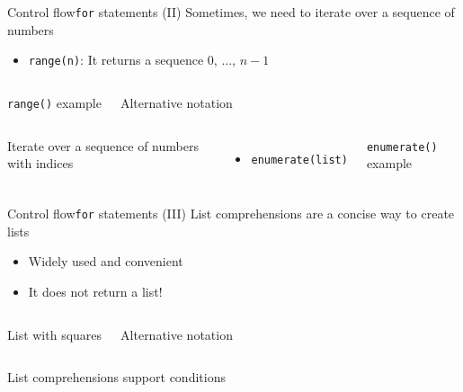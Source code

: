 \documentclass[10pt,compress]{beamer} %
\begin{document}
\begin{frame}{Control flow}{\texttt{for} statements (II)}
	Sometimes, we need to iterate over a sequence of numbers
	\begin{itemize}
		\item \texttt{range(n)}: It returns a sequence $0$, ..., $n-1$
	\end{itemize}

    \begin{columns}
		\begin{exampleblock}{\texttt{range()} example}
		
		\end{exampleblock}
		
		\begin{exampleblock}{Alternative notation}
		
		\end{exampleblock}
	\end{columns}

    \begin{columns}
	    Iterate over a sequence of numbers with indices
	    \begin{itemize}
		    \item \texttt{enumerate(list)}
	    \end{itemize}
		\begin{exampleblock}{\texttt{enumerate()} example}
		
		\end{exampleblock}
	\end{columns}
\end{frame}

\begin{frame}{Control flow}{\texttt{for} statements (III)}
	List comprehensions are a concise way to create lists
	\begin{itemize}
		\item Widely used and convenient
        \item It does not return a list!
	\end{itemize}

    \begin{columns}
		\begin{exampleblock}{List with squares}
		
		\end{exampleblock}
		
		\begin{exampleblock}{Alternative notation}
		
		\end{exampleblock}
	\end{columns}

    \bigskip

    List comprehensions support conditions

    \begin{columns}
		\begin{exampleblock}{}
		
		\end{exampleblock}
    \end{columns}
\end{frame}
\end{document}
